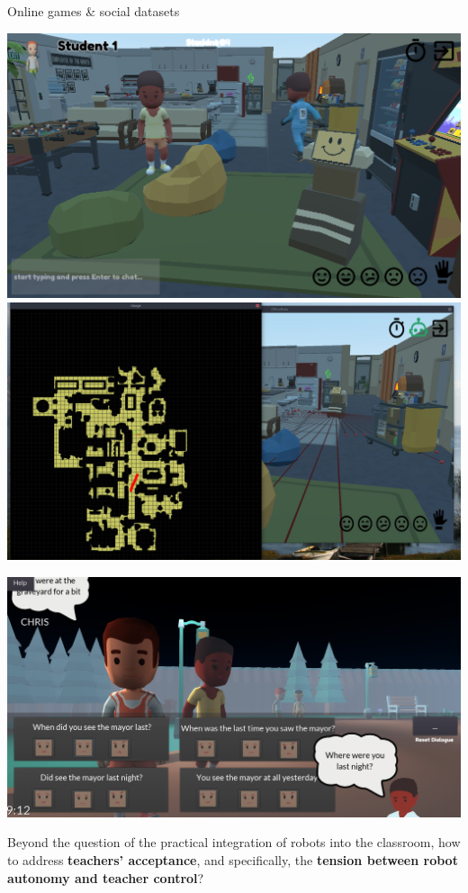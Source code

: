 \documentclass[xcolor=table]{beamer}
\begin{document}
\begin{frame}{Online games \& social datasets}
    \begin{center}
        \includegraphics[width=0.45\linewidth]{figs/online-game/officebots-screenshot-2.png}
        \includegraphics[width=0.45\linewidth]{figs/online-game/officebots-map.jpg}
    \end{center}

    \begin{center}
        \includegraphics[width=0.6\linewidth]{figs/online-game/graveyard-detective-screenshot.jpg}
    \end{center}



\end{frame}


{
\begin{frame}[plain]
    \Large
    Beyond the question of the practical integration of robots into the
    classroom, how to address \textbf{teachers' acceptance}, and specifically, the \textbf{tension between robot autonomy and teacher
    control}?

\end{frame}
}

\end{document}
